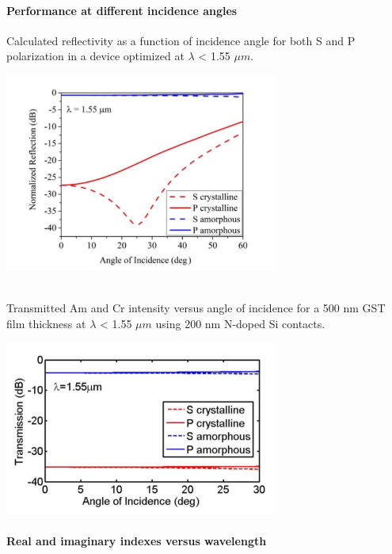 \documentclass[]{article}
\let\oldparagraph\paragraph
\renewcommand{\paragraph}[1]{\oldparagraph{#1}\mbox{}}
\begin{document}
\paragraph{Performance at different incidence
angles}\label{performance-at-different-incidence-angles}

Calculated reflectivity as a function of incidence angle for both S and
P polarization in a device optimized at $\lambda$ < 1.55 $\mu m$.\\
\centerline{\includegraphics[width = 9cm]{image/002_05.png}}\\
Transmitted Am and Cr intensity versus angle of incidence for a 500 nm
GST film thickness at $\lambda$ < 1.55 $\mu m$ using 200 nm N-doped Si contacts.\\
\centerline{\includegraphics[width = 9cm]{image/002_09.png}}

\newpage
\paragraph{Real and imaginary indexes versus
wavelength}\label{real-and-imaginary-indexes-versus-wavelength}
\end{document}
